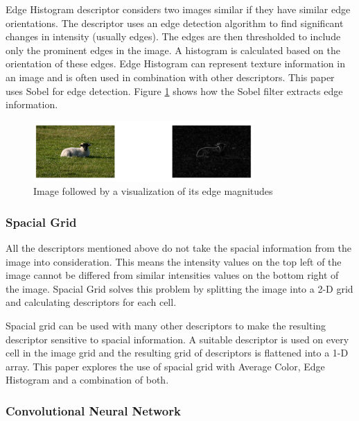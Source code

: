 Edge Histogram descriptor considers two images similar if they have similar edge orientations. The descriptor uses an
edge detection algorithm to find significant changes in intensity (usually edges). The edges are then thresholded to
include only the prominent edges in the image. A histogram is calculated based on the orientation of these edges.
Edge Histogram can represent texture information in an image and is often used in combination with other descriptors.
This paper uses Sobel \cite{digitalimageprocessing} for edge detection. Figure \ref{fig:sobel} shows how the Sobel
filter extracts edge information.

\begin{figure}[htbp]
  \begin{center}
    \includegraphics[width=0.75\textwidth]{./assets/plots/sobel.png}
    \caption{Image followed by a visualization of its edge magnitudes}
    \label{fig:sobel}
  \end{center}
\end{figure}


\subsubsection{Spacial Grid}
\label{sec:spacial_grid}

All the descriptors mentioned above do not take the spacial information from the image into consideration. This means
the intensity values on the top left of the image cannot be differed from similar intensities values on the bottom
right of the image. Spacial Grid solves this problem by splitting the image into a 2-D grid and calculating descriptors
for each cell.

Spacial grid can be used with many other descriptors to make the resulting descriptor sensitive to spacial information.
A suitable descriptor is used on every cell in the image grid and the resulting grid of descriptors is flattened into
a 1-D array. This paper explores the use of spacial grid with Average Color, Edge Histogram and a combination of both.

\subsubsection{Convolutional Neural Network}
\label{sec:conv_nn}

